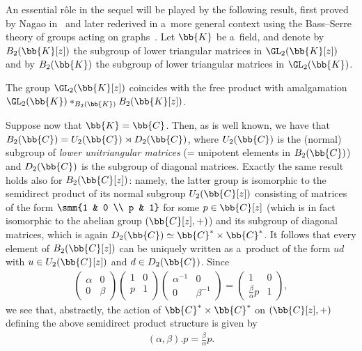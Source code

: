 An essential r\^ole in the sequel will be played by the following result, f\/irst proved by Nagao
in~\cite{naga59} and later rederived in a~more general context using the Bass--Serre theory of groups acting
on graphs~\cite{serre80}.
Let \(\bb{K}\) be a~f\/ield, and denote by \(B_{2}(\bb{K}[z])\) the subgroup of lower triangular matrices
in \(\GL_{2}(\bb{K}[z])\) and by \(B_{2}(\bb{K})\) the subgroup of lower triangular matrices in
\(\GL_{2}(\bb{K})\).
\begin{theorem}[Nagao]
\label{teo:nagao}
The group \(\GL_{2}(\bb{K}[z])\) coincides with the free product with amalgamation
\(\GL_{2}(\bb{K})\ast_{B_{2}(\bb{K})} B_{2}(\bb{K}[z])\).
\end{theorem}
Suppose now that \(\bb{K}=\bb{C}\).
Then, as is well known, we have that \(B_{2}(\bb{C}) = U_{2}(\bb{C})\rtimes D_{2}(\bb{C})\), where
\(U_{2}(\bb{C})\) is the (normal) subgroup of \emph{lower unitriangular matrices} (= unipotent elements in
\(B_{2}(\bb{C})\)) and \(D_{2}(\bb{C})\) is the subgroup of diagonal matrices.
Exactly the same result holds also for \(B_{2}(\bb{C}[z])\): namely, the latter group is isomorphic to the
semidirect product of its normal subgroup \(U_{2}(\bb{C}[z])\) consisting of matrices of the form \(\smm{1
& 0
\\
p & 1}\) for some \(p\in \bb{C}[z]\) (which is in fact isomorphic to the abelian group \((\bb{C}[z],+)\))
and its subgroup of diagonal matrices, which is again \(D_{2}(\bb{C})\simeq \bb{C}^{*}\times \bb{C}^{*}\).
It follows that every element of \(B_{2}(\bb{C}[z])\) can be uniquely written as a~product of the form
\(ud\) with \(u\in U_{2}(\bb{C}[z])\) and \(d\in D_{2}(\bb{C})\).
Since
\begin{gather*}
\begin{pmatrix}
\alpha&0
\\
0&\beta
\end{pmatrix}
\begin{pmatrix}
1&0
\\
p&1
\\
\end{pmatrix}
\begin{pmatrix}
\alpha^{-1}&0
\\
0&\beta^{-1}
\end{pmatrix}
=
\begin{pmatrix}
1&0
\\
\frac{\beta}{\alpha}p&1
\end{pmatrix},
\end{gather*}
we see that, abstractly, the action of \(\bb{C}^{*}\times \bb{C}^{*}\) on \((\bb{C}[z],+)\) def\/ining the
above semidirect product structure is given by
\begin{gather}
\label{eq:smdp-act}
(\alpha,\beta).p=\frac{\beta}{\alpha}p.
\end{gather}

